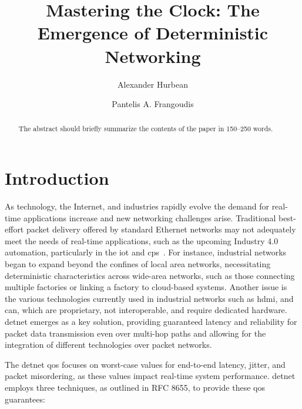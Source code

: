 \documentclass[runningheads]{llncs}
\begin{document}
\title{Mastering the Clock: The Emergence of Deterministic Networking}
\author{Alexander Hurbean \and
  Pantelis A. Frangoudis}

\maketitle              %

\begin{abstract}
  The abstract should briefly summarize the contents of the paper in
  150--250 words.
  
\end{abstract}

\section{Introduction}

As technology, the Internet, and industries rapidly evolve the demand for real-time applications increase and new networking challenges arise. Traditional best-effort packet delivery offered by standard Ethernet networks may not adequately meet the needs of real-time applications, such as the upcoming Industry 4.0 automation, particularly in the \gls{iot} and \gls{cps}~\cite{Wollschlaeger2017}. For instance, industrial networks began to expand beyond the confines of local area networks, necessitating deterministic characteristics across wide-area networks, such as those connecting multiple factories or linking a factory to cloud-based systems. Another issue is the various technologies currently used in industrial networks such as \gls{hdmi}, and \gls{can}, which are proprietary, not interoperable, and require dedicated hardware. \gls{detnet} emerges as a key solution, providing guaranteed latency and reliability for packet data transmission even over multi-hop paths and allowing for the integration of different technologies over packet networks.

The \gls{detnet} \gls{qos} focuses on worst-case values for end-to-end latency, jitter, and packet misordering, as these values impact real-time system performance. \gls{detnet} employs three techniques, as outlined in RFC 8655, to provide these \gls{qos} guarantees:
\end{document}

